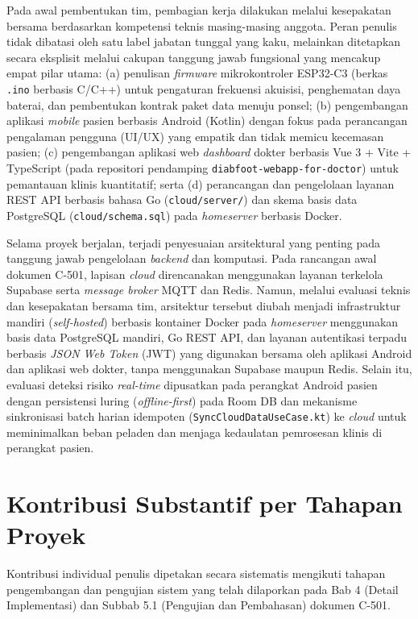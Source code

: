 Pada awal pembentukan tim, pembagian kerja dilakukan melalui kesepakatan bersama berdasarkan kompetensi teknis masing-masing anggota. Peran penulis tidak dibatasi oleh satu label jabatan tunggal yang kaku, melainkan ditetapkan secara eksplisit melalui cakupan tanggung jawab fungsional yang mencakup empat pilar utama: (a) penulisan \textit{firmware} mikrokontroler ESP32-C3 (berkas \texttt{.ino} berbasis C/C++) untuk pengaturan frekuensi akuisisi, penghematan daya baterai, dan pembentukan kontrak paket data menuju ponsel; (b) pengembangan aplikasi \textit{mobile} pasien berbasis Android (Kotlin) dengan fokus pada perancangan pengalaman pengguna (UI/UX) yang empatik dan tidak memicu kecemasan pasien; (c) pengembangan aplikasi web \textit{dashboard} dokter berbasis Vue 3 + Vite + TypeScript (pada repositori pendamping \texttt{diabfoot-webapp-for-doctor}) untuk pemantauan klinis kuantitatif; serta (d) perancangan dan pengelolaan layanan REST API berbasis bahasa Go (\texttt{cloud/server/}) dan skema basis data PostgreSQL (\texttt{cloud/schema.sql}) pada \textit{homeserver} berbasis Docker.

Selama proyek berjalan, terjadi penyesuaian arsitektural yang penting pada tanggung jawab pengelolaan \textit{backend} dan komputasi. Pada rancangan awal dokumen C-501, lapisan \textit{cloud} direncanakan menggunakan layanan terkelola Supabase serta \textit{message broker} MQTT dan Redis. Namun, melalui evaluasi teknis dan kesepakatan bersama tim, arsitektur tersebut diubah menjadi infrastruktur mandiri (\textit{self-hosted}) berbasis kontainer Docker pada \textit{homeserver} menggunakan basis data PostgreSQL mandiri, Go REST API, dan layanan autentikasi terpadu berbasis \textit{JSON Web Token} (JWT) yang digunakan bersama oleh aplikasi Android dan aplikasi web dokter, tanpa menggunakan Supabase maupun Redis. Selain itu, evaluasi deteksi risiko \textit{real-time} dipusatkan pada perangkat Android pasien dengan persistensi luring (\textit{offline-first}) pada Room DB dan mekanisme sinkronisasi batch harian idempoten (\texttt{SyncCloudDataUseCase.kt}) ke \textit{cloud} untuk meminimalkan beban peladen dan menjaga kedaulatan pemrosesan klinis di perangkat pasien.

\section{Kontribusi Substantif per Tahapan Proyek}
\label{sec:kontribusi_tahapan}

Kontribusi individual penulis dipetakan secara sistematis mengikuti tahapan pengembangan dan pengujian sistem yang telah dilaporkan pada Bab 4 (Detail Implementasi) dan Subbab 5.1 (Pengujian dan Pembahasan) dokumen C-501.

